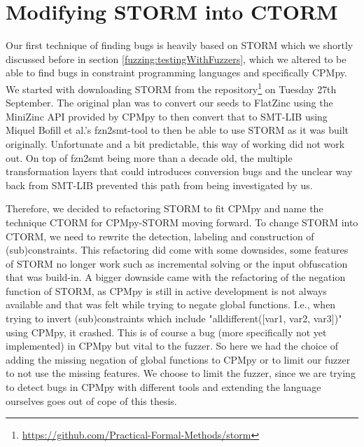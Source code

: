 \section{Modifying STORM into CTORM}
\label{impl:modifyingSTROM}
Our first technique of finding bugs is heavily based on STORM which we shortly discussed before in section \ref{fuzzing:testingWithFuzzers}, which we altered to be able to find bugs in constraint programming languages and specifically CPMpy. We started with downloading STORM from the repository\footnote{\url{https://github.com/Practical-Formal-Methods/storm}} on Tuesday 27th September.
The original plan was to convert our seeds to FlatZinc using the MiniZinc API provided by CPMpy to then convert that to SMT-LIB \cite{72bofill2010system} using Miquel Bofill et al.'s fzn2smt-tool to then be able to use STORM as it was built originally. Unfortunate and a bit predictable, this way of working did not work out. On top of fzn2smt being more than a decade old, the multiple transformation layers that could introduces conversion bugs and the unclear way back from SMT-LIB prevented this path from being investigated by us.

Therefore, we decided to refactoring STORM to fit CPMpy and name the technique CTORM for CPMpy-STORM moving forward. To change STORM into CTORM, we need to rewrite the detection, labeling and construction of (sub)constraints. This refactoring did come with some downsides, some features of STORM no longer work such as incremental solving or the input obfuscation that was build-in. A bigger downside came with the refactoring of the negation function of STORM, as CPMpy is still in active development is not always available and that was felt while trying to negate global functions. I.e., when trying to invert (sub)constraints which include "alldifferent([var1, var2, var3])" using CPMpy, it crashed. This is of course a bug (more specifically not yet implemented) in CPMpy but vital to the fuzzer. So here we had the choice of adding the missing negation of global functions to CPMpy or to limit our fuzzer to not use the missing features. We choose to limit the fuzzer, since we are trying to detect bugs in CPMpy with different tools and extending the language ourselves goes out of cope of this thesis. 



